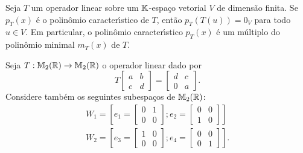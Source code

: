 \begin{teorema}\label{TeoremaCayley-Hamilton}
	Seja $T$ um operador linear sobre um $\mathbb{K}$-espa\c{c}o vetorial $V$ de dimens\~ao finita. Se $p_T(x)$ \'e o polin\^omio caracter{\'\i}stico de $T$, ent\~ao $p_T(T(u)) = 0_V$ para todo $u \in V$. Em particular, o polin\^omio caracter{\'\i}stico $p_T(x)$ \'e um m\'ultiplo do polin\^omio minimal $m_T(x)$ de $T$.
\end{teorema}

Seja $T : \mathbb{M}_2(\mathbb{R}) \to \mathbb{M}_2(\mathbb{R})$ o operador linear dado por
\[
	T \begin{bmatrix}
		a & b\\
		c & d
	\end{bmatrix} = \begin{bmatrix}
		d & c\\
		0 & a
	\end{bmatrix}.
\]
Considere tamb\'em os seguintes subespa\c{c}os de $\mathbb{M}_2(\mathbb{R})$:
\begin{align*}
	W_1 = \left[e_1 = \begin{bmatrix}
		0 & 1\\
		0 & 0
	\end{bmatrix}; e_2 = \begin{bmatrix}
		0 & 0\\
		1 & 0
	\end{bmatrix}\right]\\
	W_2 = \left[e_3 = \begin{bmatrix}
		1 & 0\\
		0 & 0
	\end{bmatrix}; e_4 = \begin{bmatrix}
		0 & 0\\
		0 & 1
	\end{bmatrix}\right].
\end{align*}

